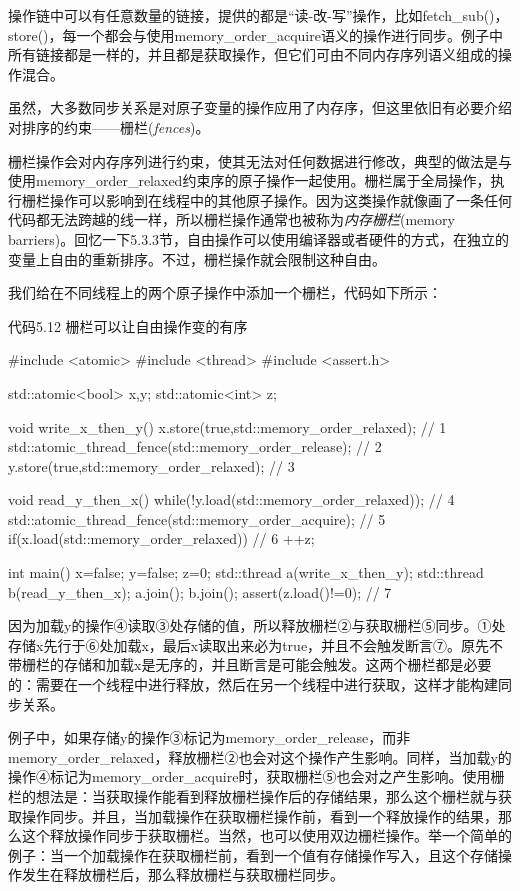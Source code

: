 操作链中可以有任意数量的链接，提供的都是“读-改-写”操作，比如fetch\_sub()，store()，每一个都会与使用memory\_order\_acquire语义的操作进行同步。例子中所有链接都是一样的，并且都是获取操作，但它们可由不同内存序列语义组成的操作混合。

虽然，大多数同步关系是对原子变量的操作应用了内存序，但这里依旧有必要介绍对排序的约束——栅栏(\textit{fences})。


栅栏操作会对内存序列进行约束，使其无法对任何数据进行修改，典型的做法是与使用memory\_order\_relaxed约束序的原子操作一起使用。栅栏属于全局操作，执行栅栏操作可以影响到在线程中的其他原子操作。因为这类操作就像画了一条任何代码都无法跨越的线一样，所以栅栏操作通常也被称为\textit{内存栅栏}(memory barriers)。回忆一下5.3.3节，自由操作可以使用编译器或者硬件的方式，在独立的变量上自由的重新排序。不过，栅栏操作就会限制这种自由。

我们给在不同线程上的两个原子操作中添加一个栅栏，代码如下所示：

代码5.12 栅栏可以让自由操作变的有序

\begin{cpp}
#include <atomic>
#include <thread>
#include <assert.h>

std::atomic<bool> x,y;
std::atomic<int> z;

void write_x_then_y()
{
  x.store(true,std::memory_order_relaxed);  // 1
  std::atomic_thread_fence(std::memory_order_release);  // 2
  y.store(true,std::memory_order_relaxed);  // 3
}

void read_y_then_x()
{
  while(!y.load(std::memory_order_relaxed));  // 4
  std::atomic_thread_fence(std::memory_order_acquire);  // 5
  if(x.load(std::memory_order_relaxed))  // 6
    ++z;
}

int main()
{
  x=false;
  y=false;
  z=0;
  std::thread a(write_x_then_y);
  std::thread b(read_y_then_x);
  a.join();
  b.join();
  assert(z.load()!=0);  // 7
}
\end{cpp}

因为加载y的操作④读取③处存储的值，所以释放栅栏②与获取栅栏⑤同步。①处存储x先行于⑥处加载x，最后x读取出来必为true，并且不会触发断言⑦。原先不带栅栏的存储和加载x是无序的，并且断言是可能会触发。这两个栅栏都是必要的：需要在一个线程中进行释放，然后在另一个线程中进行获取，这样才能构建同步关系。

例子中，如果存储y的操作③标记为memory\_order\_release，而非memory\_order\_relaxed，释放栅栏②也会对这个操作产生影响。同样，当加载y的操作④标记为memory\_order\_acquire时，获取栅栏⑤也会对之产生影响。使用栅栏的想法是：当获取操作能看到释放栅栏操作后的存储结果，那么这个栅栏就与获取操作同步。并且，当加载操作在获取栅栏操作前，看到一个释放操作的结果，那么这个释放操作同步于获取栅栏。当然，也可以使用双边栅栏操作。举一个简单的例子：当一个加载操作在获取栅栏前，看到一个值有存储操作写入，且这个存储操作发生在释放栅栏后，那么释放栅栏与获取栅栏同步。


